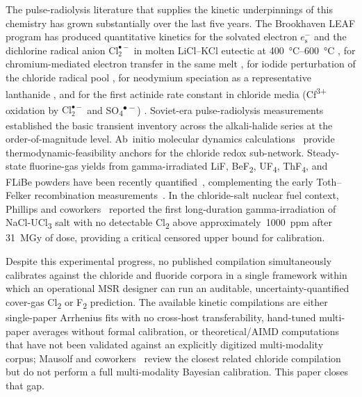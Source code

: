 \documentclass[11pt]{article}
\theoremstyle{plain}
\theoremstyle{definition}
\theoremstyle{remark}
\newcommand{\eS}{\ensuremath{e_{\mathrm{s}}^{-}}\xspace}
\newcommand{\Clt}{\ensuremath{\mathrm{Cl}_2^{\bullet-}}\xspace}
\begin{document}
The pulse-radiolysis literature that supplies the kinetic underpinnings of
this chemistry has grown substantially over the last five years.  The
Brookhaven LEAF program has produced quantitative kinetics for the solvated
electron \eS and the dichlorine radical anion \Clt in molten LiCl--KCl
eutectic at \SIrange{400}{600}{\celsius} \citep{Iwamatsu2022}, for
chromium-mediated electron transfer in the same melt
\citep{Iwamatsu2026}, for iodide perturbation of the chloride radical pool
\citep{Conrad2023}, for neodymium speciation as a representative lanthanide
\citep{CastroBaldivieso2026}, and for the first actinide rate constant in
chloride media (Cf\textsuperscript{3+} oxidation by \Clt and
SO\textsubscript{4}\textsuperscript{$\bullet-$}) \citep{Rotermund2024}.
Soviet-era pulse-radiolysis measurements
\citep{Pikaev1982,Makarov1982,Hagiwara1987} established the basic transient
inventory across the alkali-halide series at the order-of-magnitude level.
Ab~initio molecular dynamics
calculations~\citep{KristoffersenMetiu2018} provide
thermodynamic-feasibility anchors for the chloride redox sub-network.
Steady-state fluorine-gas yields from gamma-irradiated LiF, BeF\textsubscript{2},
UF\textsubscript{4}, ThF\textsubscript{4}, and FLiBe powders have been
recently quantified~\citep{Davis2022}, complementing the early Toth--Felker
recombination measurements~\citep{Toth1990}.  In the chloride-salt nuclear
fuel context, Phillips and coworkers~\citep{Phillips2022} reported the first
long-duration gamma-irradiation of NaCl-UCl\textsubscript{3} salt with no
detectable Cl\textsubscript{2} above approximately~\SI{1000}{ppm} after
\SI{31}{\mega\gray} of dose, providing a critical censored upper bound for
calibration.

Despite this experimental progress, no published compilation simultaneously
calibrates against the chloride and fluoride corpora in a single framework
within which an operational MSR designer can run an auditable,
uncertainty-quantified cover-gas Cl\textsubscript{2} or F\textsubscript{2}
prediction.  The available kinetic compilations are either single-paper
Arrhenius fits with no cross-host transferability, hand-tuned multi-paper
averages without formal calibration, or theoretical/AIMD computations that
have not been validated against an explicitly digitized multi-modality
corpus; Mausolf and coworkers~\citep{Mausolf2024} review the closest related
chloride compilation but do not perform a full multi-modality Bayesian
calibration.  This paper closes that gap.
\end{document}
